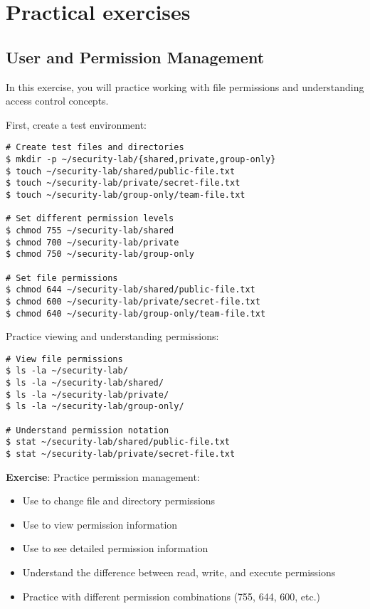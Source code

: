 \newpage

\section{Practical exercises}

\subsection{User and Permission Management}

In this exercise, you will practice working with file permissions and understanding access control concepts.

First, create a test environment:

\begin{lstlisting}[style=bashstyle]
# Create test files and directories
$ mkdir -p ~/security-lab/{shared,private,group-only}
$ touch ~/security-lab/shared/public-file.txt
$ touch ~/security-lab/private/secret-file.txt
$ touch ~/security-lab/group-only/team-file.txt

# Set different permission levels
$ chmod 755 ~/security-lab/shared
$ chmod 700 ~/security-lab/private
$ chmod 750 ~/security-lab/group-only

# Set file permissions
$ chmod 644 ~/security-lab/shared/public-file.txt
$ chmod 600 ~/security-lab/private/secret-file.txt
$ chmod 640 ~/security-lab/group-only/team-file.txt
\end{lstlisting}

Practice viewing and understanding permissions:

\begin{lstlisting}[style=bashstyle]
# View file permissions
$ ls -la ~/security-lab/
$ ls -la ~/security-lab/shared/
$ ls -la ~/security-lab/private/
$ ls -la ~/security-lab/group-only/

# Understand permission notation
$ stat ~/security-lab/shared/public-file.txt
$ stat ~/security-lab/private/secret-file.txt
\end{lstlisting}

\textbf{Exercise}: Practice permission management:
\begin{itemize}
    \item Use  to change file and directory permissions
    \item Use  to view permission information
    \item Use  to see detailed permission information
    \item Understand the difference between read, write, and execute permissions
    \item Practice with different permission combinations (755, 644, 600, etc.)
\end{itemize}

